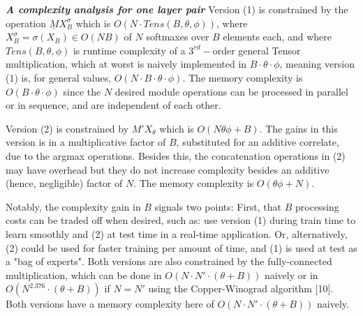 \documentclass[12pt]{article}
\begin{document}
\begin{itemize}
\begin{enumerate}
	\end{enumerate}\textit{\textbf{A complexity analysis for one layer pair}} 
	Version (1) is constrained by the operation $\underline{M}X_B^\sigma$ which is $O(N \cdot Tens(B,\theta,\phi))$, where $X_B^\sigma = \sigma(X_B) \in O(NB)$ of $N$ softmaxes over $B$ elements each, and where $Tens(B,\theta,\phi)$ is runtime complexity of a $3^{rd}-$order general Tensor multiplication, which at worst is naively implemented in $B\cdot \theta \cdot \phi$, meaning version (1) is, for general values, $O(N \cdot B \cdot \theta \cdot \phi)$. The memory complexity is $O(B \cdot \theta \cdot \phi)$ since the $N$ desired module operations can be processed in parallel or in sequence, and are independent of each other.  \par
	Version (2) is constrained by $M'X_\theta$ which is $O(N\theta \phi + B)$.  The gains in this version is in a multiplicative factor of $B$, substituted for an additive correlate, due to the argmax operations. Besides this, the concatenation operations in (2) may have overhead but they do not increase complexity besides an additive (hence, negligible) factor of $N$. The memory complexity is $O(\theta\phi+N)$.\par
	Notably, the complexity gain in $B$ signals two points:  First, that $B$ processing costs can be traded off when desired, such as: use version (1) during train time to learn smoothly and (2) at test time in a real-time application.  Or, alternatively, (2) could be used for faster training per amount of time, and (1) is used at test as a "bag of experts". 
	Both versions are also constrained by the fully-connected multiplication, which can be done in $O(N\cdot N' \cdot (\theta+B))$ naively or in $O(N^{2.376} \cdot (\theta+B))$ if $N=N'$ using the Copper-Winograd algorithm [10].  Both versions have a memory complexity here of $O(N\cdot N' \cdot (\theta+B))$ naively.


\end{itemize}
\end{document}
